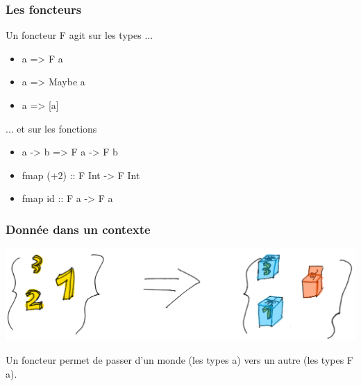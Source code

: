\documentclass{beamer}
\begin{document}
\begin{frame}
\frametitle{Les foncteurs}
\begin{block}{Un foncteur F agit sur les types ...}
\begin{itemize}
\item a => F a
\end{itemize}
\end{block}
\begin{exampleblock}{}
\begin{itemize}
\item a => Maybe a
\item a => [a]
\end{itemize}
\end{exampleblock}

\pause

\begin{block}{... et sur les fonctions}
\begin{itemize}
\item a -> b => F a -> F b
\end{itemize}
\end{block}

\begin{exampleblock}{}
\begin{itemize}
\item fmap (+2) :: F Int -> F Int
\item fmap id :: F a -> F a
\end{itemize}
\end{exampleblock}
\end{frame}

\begin{frame}
\frametitle{Donnée dans un contexte}

\begin{center}
\includegraphics[scale=0.25]{a2fa.png}
\end{center}

\begin{block}{}
Un foncteur permet de passer d'un monde (les types a) vers un autre (les types F a).
\end{block}

\end{frame}
\end{document}
